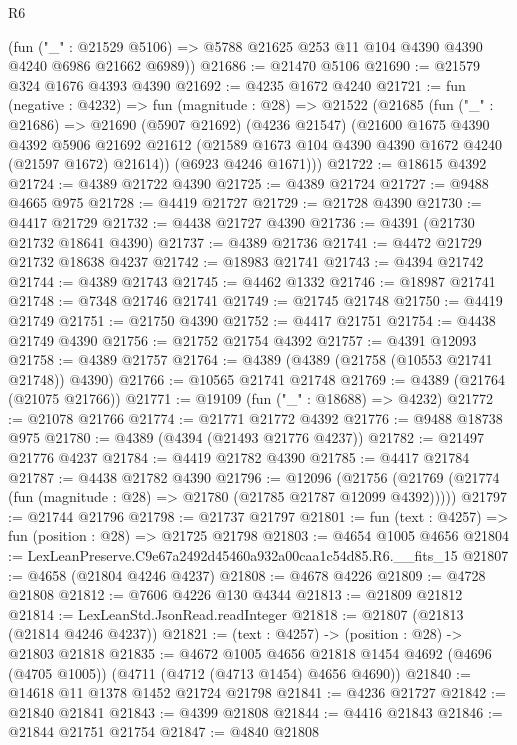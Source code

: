 \begin{lexlean}{R6}
\begin{coremodule}
      (fun ("_" : @21529 @5106) => @5788 @21625 @253 @11 @104 @4390 @4390 @4240 @6986 @21662 @6989))
@21686 := @21470 @5106
@21690 := @21579 @324 @1676 @4393 @4390
@21692 := @4235 @1672 @4240
@21721 := fun (negative : @4232) =>
  fun (magnitude : @28) =>
  @21522
    (@21685
      (fun ("_" : @21686) =>
      @21690
        (@5907 @21692)
        (@4236 @21547)
        (@21600
          @1675
          @4390
          @4392
          @5906
          @21692
          @21612
          (@21589 @1673 @104 @4390 @4390 @1672 @4240 (@21597 @1672) @21614))
        (@6923 @4246 @1671)))
@21722 := @18615 @4392
@21724 := @4389 @21722 @4390
@21725 := @4389 @21724
@21727 := @9488 @4665 @975
@21728 := @4419 @21727
@21729 := @21728 @4390
@21730 := @4417 @21729
@21732 := @4438 @21727 @4390
@21736 := @4391 (@21730 @21732 @18641 @4390)
@21737 := @4389 @21736
@21741 := @4472 @21729 @21732 @18638 @4237
@21742 := @18983 @21741
@21743 := @4394 @21742
@21744 := @4389 @21743
@21745 := @4462 @1332
@21746 := @18987 @21741
@21748 := @7348 @21746 @21741
@21749 := @21745 @21748
@21750 := @4419 @21749
@21751 := @21750 @4390
@21752 := @4417 @21751
@21754 := @4438 @21749 @4390
@21756 := @21752 @21754 @4392
@21757 := @4391 @12093
@21758 := @4389 @21757
@21764 := @4389 (@4389 (@21758 (@10553 @21741 @21748)) @4390)
@21766 := @10565 @21741 @21748
@21769 := @4389 (@21764 (@21075 @21766))
@21771 := @19109 (fun ("_" : @18688) => @4232)
@21772 := @21078 @21766
@21774 := @21771 @21772 @4392
@21776 := @9488 @18738 @975
@21780 := @4389 (@4394 (@21493 @21776 @4237))
@21782 := @21497 @21776 @4237
@21784 := @4419 @21782 @4390
@21785 := @4417 @21784
@21787 := @4438 @21782 @4390
@21796 := @12096
    (@21756 (@21769 (@21774 (fun (magnitude : @28) => @21780 (@21785 @21787 @12099 @4392)))))
@21797 := @21744 @21796
@21798 := @21737 @21797
@21801 := fun (text : @4257) => fun (position : @28) => @21725 @21798
@21803 := @4654 @1005 @4656
@21804 := LexLeanPreserve.C9e67a2492d45460a932a00caa1c54d85.R6.__fits_15
@21807 := @4658 (@21804 @4246 @4237)
@21808 := @4678 @4226
@21809 := @4728 @21808
@21812 := @7606 @4226 @130 @4344
@21813 := @21809 @21812
@21814 := LexLeanStd.JsonRead.readInteger
@21818 := @21807 (@21813 (@21814 @4246 @4237))
@21821 := (text : @4257) -> (position : @28) -> @21803 @21818
@21835 := @4672
    @1005
    @4656
    @21818
    @1454
    @4692
    (@4696 (@4705 @1005))
    (@4711 (@4712 (@4713 @1454) @4656 @4690))
@21840 := @14618 @11 @1378 @1452 @21724 @21798
@21841 := @4236 @21727
@21842 := @21840 @21841
@21843 := @4399 @21808
@21844 := @4416 @21843
@21846 := @21844 @21751 @21754
@21847 := @4840 @21808

\end{coremodule}
\end{lexlean}
